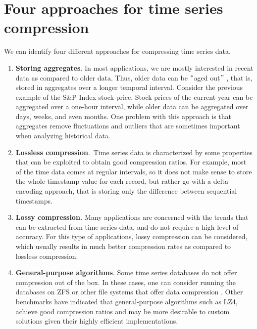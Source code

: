 \section{Four approaches for time series compression}
We can identify four different approaches for compressing time series data.
\begin{enumerate}
	\item \textbf{Storing aggregates}. In most applications, we are mostly interested in
	recent data as compared to older data. Thus, older data can be $``$aged out$"$ , that is,
	stored in aggregates over a longer temporal interval. Consider the previous example of
	the S\&P Index stock price. Stock prices of the current year can be aggregated over a
	one-hour interval, while older data can be aggregated over days, weeks, and even months.
	One problem with this approach is that aggregates remove fluctuations and outliers that
	are sometimes important when analyzing historical data.
	\item \textbf{Lossless compression}.\ Time series data is characterized by some properties
	that can be exploited to obtain good compression ratios.  For example, most of the time
	data comes at regular intervals, so it does not make sense to store the whole timestamp
	value for each record, but rather go with a delta encoding approach, that is storing only
	the difference between sequential timestamps.
	\item \textbf{Lossy compression. }Many applications are concerned with the trends that
	can be extracted from time series data, and do not require a high level of accuracy. For
	this type of applications, lossy compression can be considered, which usually results in
	much better compression rates as compared to lossless compression.
	\item \textbf{General-purpose algorithms}. Some time series databases do not offer
	compression out of the box. In these cases, one can consider running the databases on
	ZFS or other file systems that offer data compression \cite{A2019TimescaleDB}. Other
	benchmarks \cite{Danjou2016Timeseries} have indicated that general-purpose algorithms
	such as LZ4, achieve good compression ratios and may be more desirable to custom solutions
	given their highly efficient implementations.
\end{enumerate}